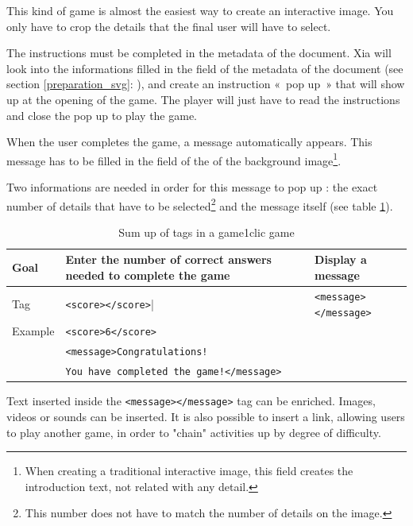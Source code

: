 This kind of game is almost the easiest way to create an interactive image.
You only have to crop the details that the final user will have to select. 

The instructions must be completed in the 
metadata of the document. Xia will look into 
the informations  filled in the  field of the metadata of the document (see section \ref{preparation_svg}: ), and create an instruction «~pop up~» that will show up at the opening of the game. The player will just have to read the instructions and close the pop up to play the game.

When the user completes the game, a message automatically appears.
This message has to be filled in the  field of the  of the 
background image\footnote{When creating a traditional interactive image, 
this field creates the introduction text, not related with any detail.}. 

Two informations are needed in order for this message to pop up :
the exact number of details that have to be selected\footnote{This number does 
not have to match the number of details on the image.}
and the message itself (see table \ref{tag1_sumup}).

\begin{table}
 \begin{tabular}{|l|p{2in}|p{2in}|}
 \hline
  Goal & Enter the number of correct answers needed to complete the game & Display a message\\
  \hline
  Tag & \texttt{<score></score>}| & \texttt{<message></message>}\\
  \hline
  Example & \multicolumn{2}{|l|}{\texttt{<score>6</score>}}\\
   & \multicolumn{2}{|l|}{\texttt{<message>Congratulations!}}\\
    & \multicolumn{2}{|l|}{\texttt{You have completed the game!</message>}}\\
  \hline
 \end{tabular}
\caption{Sum up of tags in a game1clic game}
\label{tag1_sumup}
\end{table}
 
\begin{astuce}
Text inserted inside the \verb|<message></message>| tag can be 
enriched. Images, videos or sounds can be inserted.
It is also possible to insert a link, allowing users to play another game,
in order to "chain" activities up by degree of difficulty.
\end{astuce}


